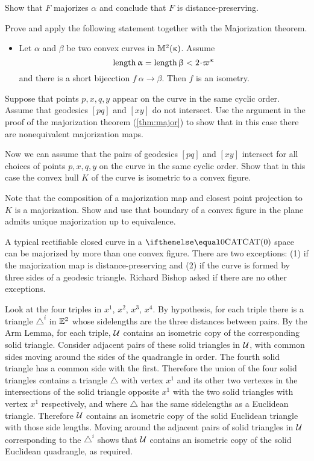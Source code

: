 Show that $F$ majorizes $\alpha$
and conclude that $F$ is distance-preserving.

Prove and apply the following statement together with the Majorization theorem.
\begin{itemize}
\item Let $\alpha$ and $\beta$ be two convex curves in $\mathbb{M}_{{}}^{2}({\upkappa})$.
Assume 
\[\length \alpha=\length\beta<2\cdot\varpi\kappa\]
and there is a short bijecction $f\:\alpha\to\beta$.
Then $f$ is an isometry.
\end{itemize}

Suppose that points $p,x,q,y$ appear on the curve in the same cyclic order.
Assume that geodesics $[pq]$ and $[xy]$ do not intersect.
Use the argument in the proof of the majorization theorem (\ref{thm:major}) to show that in this case there are nonequivalent majorization maps.

Now we can assume that the pairs of geodesics $[pq]$ and $[xy]$ intersect for all choices of points $p,x,q,y$ on the curve in the same cyclic order.
Show that in this case the convex hull $K$ of the curve is isometric to a convex figure.

Note that the composition of a majorization map and closest point projection to $K$ is a majorization.
Show and use that boundary of a convex figure in the plane admits unique majorization up to equivalence.

A typical rectifiable closed curve in a $\CAT0$ space can be majorized by more than one convex figure.
There are two exceptions: (1) if the majorization map is distance-preserving and (2) if the curve is  formed by three sides of a geodesic triangle.
Richard Bishop asked if there are no other exceptions.

Look at the four triples in $x^1$, $x^2$, $x^3$, $x^4$.
By  hypothesis, for each triple there is a triangle ${\triangle}^i$ in $\mathbb{E}^2$ whose  sidelengths are the three distances between pairs.
By the Arm Lemma, for each triple, $\mathcal{U}$ contains an isometric copy of the corresponding solid triangle.
Consider adjacent pairs of these solid triangles in $\mathcal{U}$, with common sides moving around the sides of the quadrangle in order.
The fourth solid triangle has a common side with the first.
Therefore the union of the four solid triangles contains a triangle $\triangle$ with vertex $x^1$ and its other two vertexes in the intersections of the solid  triangle opposite $x^1$ with the two solid triangles with vertex $x^1$ respectively, and where $\triangle$ has the same sidelengths as a Euclidean triangle.
Therefore $\mathcal{U}$ contains an isometric copy of the solid Euclidean triangle with those side lengths.
Moving around the adjacent pairs of solid triangles in $\mathcal{U}$ corresponding to the ${\triangle}^i$ shows that $\mathcal{U}$ contains an isometric copy of the solid Euclidean quadrangle, as required.

